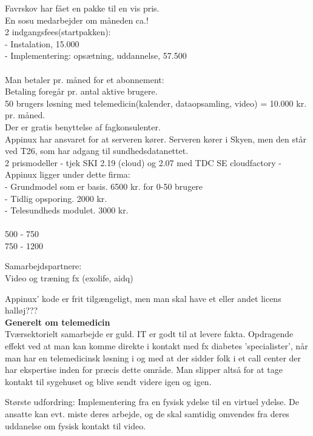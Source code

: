 Favrskov har fået en pakke til en vis pris.\\
En sosu medarbejder om måneden ca.!\\
2 indgangsfees(startpakken):\\
 - Instalation, 15.000\\
 - Implementering: opsætning, uddannelse, 57.500\\\\
Man betaler pr. måned for et abonnement: \\
Betaling foregår pr. antal aktive brugere. \\
50 brugers løsning med telemedicin(kalender, dataopsamling, video) =
10.000 kr. pr. måned. \\
Der er gratis benyttelse af fagkonsulenter.\\
Appinux har ansvaret for at serveren kører. Serveren kører i Skyen, men den står ved T26, som har adgang til sundhedsdatanettet.\\

2 prismodeller - tjek SKI 2.19 (cloud) og 2.07 med TDC
SE cloudfactory - Appinux ligger under dette firma:\\
- Grundmodel som er basis. 6500 kr. for 0-50 brugere\\
- Tidlig opsporing. 2000 kr.\\
- Telesundheds modulet. 3000 kr.\\\\
500 - 750\\
750 - 1200

Samarbejdspartnere:\\
Video og træning fx (exolife, aidq)


Appinux' kode er frit tilgængeligt, men man skal have et eller andet licens halløj???\\


\textbf{Generelt om telemedicin} 
\\
Tværsektorielt samarbejde er guld. IT er godt til at levere fakta.
Opdragende effekt ved at man kan komme direkte i kontakt med fx diabetes 'specialister', når man har en telemedicinsk løsning i og med at der sidder folk i et call center der har ekspertise inden for præcis dette område. 
Man slipper altså for at tage kontakt til sygehuset og blive sendt videre igen og igen.

Største udfordring:
Implementering fra en fysisk ydelse til en virtuel ydelse.
De ansatte kan evt. miste deres arbejde, og de skal samtidig omvendes fra deres uddanelse om fysisk kontakt til video.	

